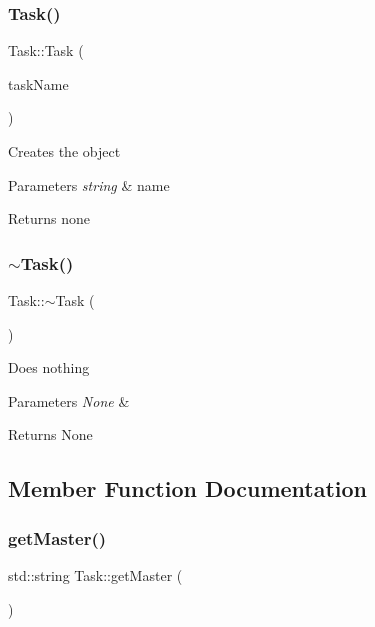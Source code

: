 \subsubsection{\texorpdfstring{Task()}{Task()}\hspace{0.1cm}{\footnotesize\ttfamily [2/2]}}
{\footnotesize\ttfamily Task\+::\+Task (\begin{DoxyParamCaption}\item[{std\+::string}]{task\+Name }\end{DoxyParamCaption})}

Creates the object 
\begin{DoxyParams}{Parameters}
{\em string} & name \\
\hline
\end{DoxyParams}
\begin{DoxyReturn}{Returns}
none 
\end{DoxyReturn}
\mbox{\label{class_task_a3ecf499ea35fb4a96853969a1e1cbbce}} 
\subsubsection{\texorpdfstring{$\sim$\+Task()}{~Task()}}
{\footnotesize\ttfamily Task\+::$\sim$\+Task (\begin{DoxyParamCaption}{ }\end{DoxyParamCaption})}

Does nothing 
\begin{DoxyParams}{Parameters}
{\em None} & \\
\hline
\end{DoxyParams}
\begin{DoxyReturn}{Returns}
None 
\end{DoxyReturn}


\subsection{Member Function Documentation}
\mbox{\label{class_task_ac9ff345f85948cb8877be93a18096795}} 
\subsubsection{\texorpdfstring{get\+Master()}{getMaster()}}
{\footnotesize\ttfamily std\+::string Task\+::get\+Master (\begin{DoxyParamCaption}{ }\end{DoxyParamCaption})}

